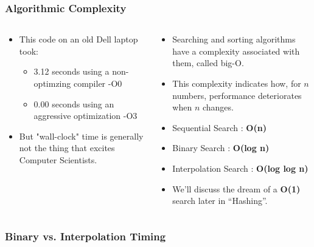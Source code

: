 \begin{frame}[fragile]
\frametitle{Algorithmic Complexity}
\begin{columns}[T]

\begin{column}{0.55\textwidth}

\begin{itemize}[<+->]
\item This code on an old Dell laptop took:
\begin{itemize}[<+->]
\item 3.12 seconds using a non-optimzing compiler -O0
\item 0.00 seconds using an aggressive optimization -O3
\end{itemize}
\item But "wall-clock" time is generally not the thing that excites Computer Scientists.
\end{itemize}
\end{column}

\pause
\begin{column}{0.35\textwidth}
\begin{itemize}[<+->]
\item Searching and sorting algorithms have a complexity associated with them, called big-O.
\item This complexity indicates how, for $n$ numbers, performance deteriorates when $n$ changes.
\item Sequential Search : {\bf O(n)}
\item Binary Search : {\bf O(log n)}
\item Interpolation Search : {\bf O(log log n)}
\item We'll discuss the dream of a {\bf O(1)} search later in ``Hashing''.
\end{itemize}
\end{column}


\end{columns}
\end{frame}


\begin{frame}[fragile]
\frametitle{Binary vs. Interpolation Timing}
\begin{columns}[T]

\begin{column}{0.55\textwidth}

\end{column}

\pause
\begin{column}{0.35\textwidth}
\end{column}

\end{columns}
\end{frame}

